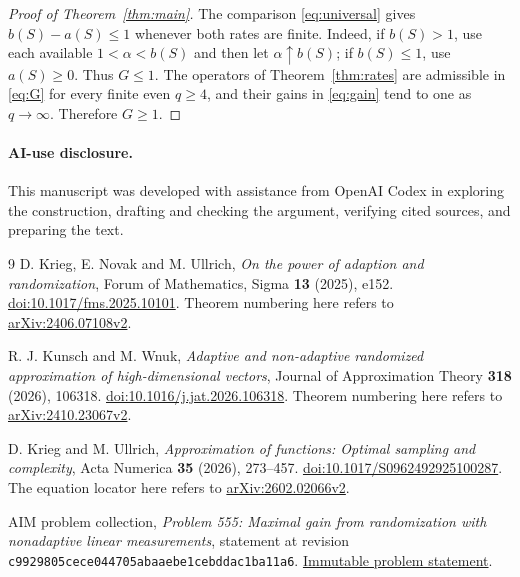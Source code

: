 \documentclass[11pt]{article}
\begin{document}
\begin{proof}[Proof of Theorem~\ref{thm:main}]
The comparison \eqref{eq:universal} gives \(b(S)-a(S)\le1\) whenever
both rates are finite. Indeed, if \(b(S)>1\), use each available
\(1<\alpha<b(S)\) and then let \(\alpha\uparrow b(S)\); if \(b(S)\le1\),
use \(a(S)\ge0\). Thus \(G\le1\).
The operators of Theorem~\ref{thm:rates} are admissible in \eqref{eq:G}
for every finite even \(q\ge4\), and their gains in \eqref{eq:gain}
tend to one as \(q\to\infty\). Therefore \(G\ge1\).
\end{proof}

\paragraph{AI-use disclosure.}
This manuscript was developed with assistance from OpenAI Codex in exploring
the construction, drafting and checking the argument, verifying cited sources,
and preparing the text.

\begin{thebibliography}{9}
D. Krieg, E. Novak and M. Ullrich,
\emph{On the power of adaption and randomization},
Forum of Mathematics, Sigma \textbf{13} (2025), e152.
\href{https://doi.org/10.1017/fms.2025.10101}{doi:10.1017/fms.2025.10101}.
Theorem numbering here refers to
\href{https://arxiv.org/abs/2406.07108v2}{arXiv:2406.07108v2}.

R. J. Kunsch and M. Wnuk,
\emph{Adaptive and non-adaptive randomized approximation of
high-dimensional vectors},
Journal of Approximation Theory \textbf{318} (2026), 106318.
\href{https://doi.org/10.1016/j.jat.2026.106318}{doi:10.1016/j.jat.2026.106318}.
Theorem numbering here refers to
\href{https://arxiv.org/abs/2410.23067v2}{arXiv:2410.23067v2}.

D. Krieg and M. Ullrich,
\emph{Approximation of functions: Optimal sampling and complexity},
Acta Numerica \textbf{35} (2026), 273--457.
\href{https://doi.org/10.1017/S0962492925100287}{doi:10.1017/S0962492925100287}.
The equation locator here refers to
\href{https://arxiv.org/abs/2602.02066v2}{arXiv:2602.02066v2}.

AIM problem collection,
\emph{Problem 555: Maximal gain from randomization with nonadaptive
linear measurements},
statement at revision \texttt{c9929805cece044705abaaebe1cebddac1ba11a6}.
\href{https://github.com/MColbrook/AIM/blob/c9929805cece044705abaaebe1cebddac1ba11a6/problems/555-nonadaptive-randomization-gain.md}{Immutable problem statement}.
\end{thebibliography}
\end{document}
